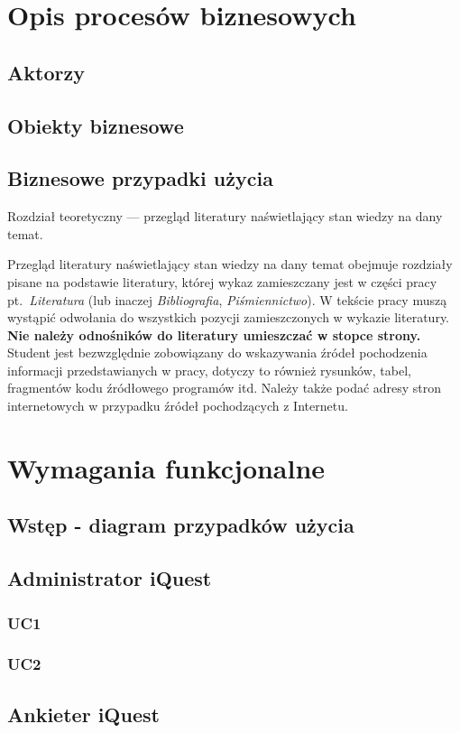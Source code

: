 
\chapter{Opis procesów biznesowych}
\section{Aktorzy}
\section{Obiekty biznesowe}
\section{Biznesowe przypadki użycia}

Rozdział teoretyczny --- przegląd literatury naświetlający stan wiedzy na dany temat. 

Przegląd literatury naświetlający stan wiedzy na dany temat obejmuje rozdziały pisane na podstawie
literatury, której wykaz zamieszczany jest w części pracy pt.~\emph{Literatura} (lub inaczej \emph{Bibliografia},
\emph{Piśmiennictwo}). W tekście pracy muszą wystąpić odwołania do wszystkich pozycji zamieszczonych w
wykazie literatury. \textbf{Nie należy odnośników do literatury umieszczać w stopce strony.} Student jest
bezwzględnie zobowiązany do wskazywania źródeł pochodzenia informacji przedstawianych w pracy,
dotyczy to również rysunków, tabel, fragmentów kodu źródłowego programów itd. Należy także podać
adresy stron internetowych w przypadku źródeł pochodzących z Internetu.

\chapter{Wymagania funkcjonalne}
\section{Wstęp - diagram przypadków użycia}
\section{Administrator iQuest}
\subsection{UC1}
\subsection{UC2}
\section{Ankieter iQuest}
